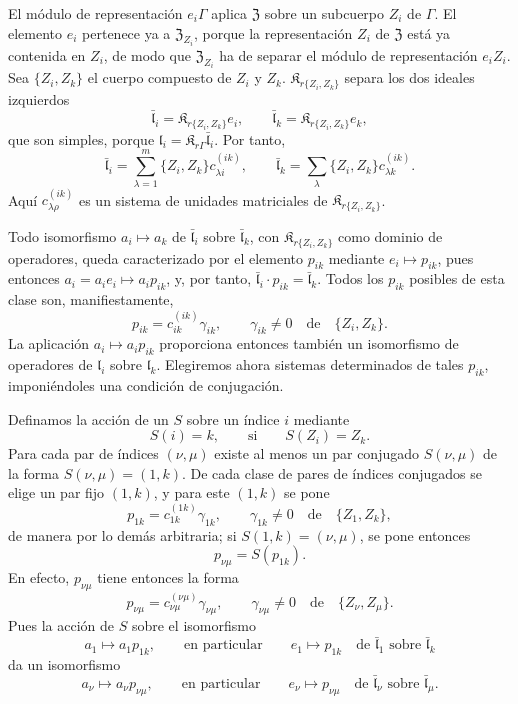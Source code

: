 El módulo de representación \(e_i\Gamma\) aplica \(\mathfrak Z\) sobre un subcuerpo \(Z_i\) de \(\Gamma\). El elemento \(e_i\) pertenece ya a \(\mathfrak Z_{Z_i}\), porque la representación \(Z_i\) de \(\mathfrak Z\) está ya contenida en \(Z_i\), de modo que \(\mathfrak Z_{Z_i}\) ha de separar el módulo de representación \(e_iZ_i\). Sea \(\{Z_i,Z_k\}\) el cuerpo compuesto de \(Z_i\) y \(Z_k\). \(\mathfrak K_{r\{Z_i,Z_k\}}\) separa los dos ideales izquierdos
\[
\bar{\mathfrak l}_i=\mathfrak K_{r\{Z_i,Z_k\}}e_i,
\qquad
\bar{\mathfrak l}_k=\mathfrak K_{r\{Z_i,Z_k\}}e_k,
\]
que son simples, porque \(\mathfrak l_i=\mathfrak K_{r\Gamma}\bar{\mathfrak l}_i\). Por tanto,
\[
\bar{\mathfrak l}_i=\sum_{\lambda=1}^m\{Z_i,Z_k\}c_{\lambda i}^{(ik)},
\qquad
\bar{\mathfrak l}_k=\sum_{\lambda}\{Z_i,Z_k\}c_{\lambda k}^{(ik)}.
\]
Aquí \(c_{\lambda\rho}^{(ik)}\) es un sistema de unidades matriciales de \(\mathfrak K_{r\{Z_i,Z_k\}}\).

Todo isomorfismo \(a_i\mapsto a_k\) de \(\bar{\mathfrak l}_i\) sobre \(\bar{\mathfrak l}_k\), con \(\mathfrak K_{r\{Z_i,Z_k\}}\) como dominio de operadores, queda caracterizado por el elemento \(p_{ik}\) mediante \(e_i\mapsto p_{ik}\), pues entonces \(a_i=a_ie_i\mapsto a_ip_{ik}\), y, por tanto, \(\bar{\mathfrak l}_i\cdot p_{ik}=\bar{\mathfrak l}_k\). Todos los \(p_{ik}\) posibles de esta clase son, manifiestamente,
\[
p_{ik}=c_{ik}^{(ik)}\gamma_{ik},
\qquad
\gamma_{ik}\ne0\quad\text{de}\quad \{Z_i,Z_k\}.
\]
La aplicación \(a_i\mapsto a_ip_{ik}\) proporciona entonces también un isomorfismo de operadores de \(\mathfrak l_i\) sobre \(\mathfrak l_k\). Elegiremos ahora sistemas determinados de tales \(p_{ik}\), imponiéndoles una condición de conjugación.

Definamos la acción de un \(S\) sobre un índice \(i\) mediante
\[
S(i)=k,
\qquad\text{si}\qquad
S(Z_i)=Z_k.
\]
Para cada par de índices \((\nu,\mu)\) existe al menos un par conjugado \(S(\nu,\mu)\) de la forma \(S(\nu,\mu)=(1,k)\). De cada clase de pares de índices conjugados se elige un par fijo \((1,k)\), y para este \((1,k)\) se pone
\[
p_{1k}=c_{1k}^{(1k)}\gamma_{1k},
\qquad
\gamma_{1k}\ne0\quad\text{de}\quad \{Z_1,Z_k\},
\]
de manera por lo demás arbitraria; si \(S(1,k)=(\nu,\mu)\), se pone entonces
\[
p_{\nu\mu}=S(p_{1k}).
\]
En efecto, \(p_{\nu\mu}\) tiene entonces la forma
\[
p_{\nu\mu}=c_{\nu\mu}^{(\nu\mu)}\gamma_{\nu\mu},
\qquad
\gamma_{\nu\mu}\ne0\quad\text{de}\quad \{Z_\nu,Z_\mu\}.
\]
Pues la acción de \(S\) sobre el isomorfismo
\[
a_1\mapsto a_1p_{1k},
\qquad\text{en particular}\qquad
e_1\mapsto p_{1k}
\quad\text{de }\bar{\mathfrak l}_1\text{ sobre }\bar{\mathfrak l}_k
\]
da un isomorfismo
\[
a_\nu\mapsto a_\nu p_{\nu\mu},
\qquad\text{en particular}\qquad
e_\nu\mapsto p_{\nu\mu}
\quad\text{de }\bar{\mathfrak l}_\nu\text{ sobre }\bar{\mathfrak l}_\mu.
\]

